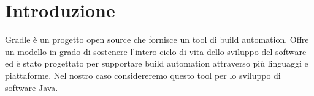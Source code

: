 \section{Introduzione}
Gradle è un progetto open source che fornisce un tool di build automation. Offre un modello in grado di sostenere l'intero ciclo di vita dello sviluppo del software ed è stato progettato per supportare build automation attraverso più linguaggi e piattaforme. Nel nostro caso considereremo questo tool per lo sviluppo di software Java.



